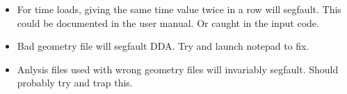 \documentclass{article}
\begin{document}
\begin{itemize}


\item For time loads, giving the same time value twice in a 
row will segfault.  This could be documented in the user
manual.  Or caught in the input code.

\item  Bad geometry file will segfault DDA.   Try and launch 
notepad to fix.


\item Anlysis files used with wrong geometry files will 
invariably segfault.  Should probably try and trap this.

\end{itemize}




\end{document}
